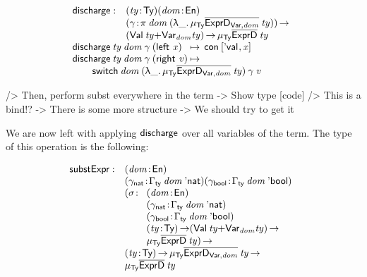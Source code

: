 \[\stk{
\begin{array}{@{}ll}
\discharge : & \PITEL{\V{ty}}{\Ty}
               \PITEL{\V{dom}}{\EnumU} \\
             & \PI{\V{\gamma}}{\spi{\V{dom}}{(\LAM{\_} \IMu{\Ty}{\toIDesc{\HExprVarD{\V{dom}}}}{\V{ty}})}} \\
             & (\SUM{\Val{\V{ty}}}{\Var{\V{dom}}{\V{ty}}}) \To
               \IMu{\Ty}{\toIDesc{\HExprD}}{\V{ty}} 
\end{array} \\
\begin{array}{@{}l@{\:\mapsto\:\:}l}
\discharge\: \V{ty}\: \V{dom}\: \V{\gamma}\: (\SumLeft \V{x})  & \Con{\pair{\Eval{\!}}{\V{x}}{}} \\
\discharge\: \V{ty}\: \V{dom}\: \V{\gamma}\: (\SumRight \V{v}) &
\end{array}\\
\qquad\switch{\V{dom}}{(\LAM{\_}
\IMu{\Ty}{\toIDesc{\HExprVarD{\V{dom}}}}{\V{ty}})}{\V{\gamma}}{\V{v}}
}\]

\begin{wstructure}
            /> Then, perform subst everywhere in the term
                -> Show type [code]
                /> This is a bind!?
                -> There is some more structure 
                    -> We should try to get it
\end{wstructure}

We are now left with applying $\discharge$ over all variables of the
term. The type of this operation is the following:

\newcommand{\substH}{\F{substExpr}}
\newcommand{\domNat}{dom_{\CN{nat}}}
\newcommand{\domBool}{dom_{\CN{bool}}}
\newcommand{\gammaNat}{\V{\ensuremath{\gamma_{\CN{nat}}}}}
\newcommand{\gammaBool}{\V{\ensuremath{\gamma_{\CN{bool}}}}}
\newcommand{\GammaSpi}[2]{\F{\ensuremath{\Gamma_{\CN{ty}}}}\: #1\: #2}

\[
\begin{array}{@{}ll}
\substH  : & \PITEL{\V{dom}}{\EnumU} \\
           & \PITEL{\V{\gammaNat}}{\GammaSpi{\V{dom}}{\Enat}} 
             \PITEL{\V{\gammaBool}}{\GammaSpi{\V{dom}}{\Ebool}} \\
           & \begin{array}{@{}ll}
             \PI{\V{\sigma}}{& \PITEL{\V{dom}}{\EnumU} \\
                             & \PITEL{\V{\gammaNat}}
                                     {\GammaSpi{\V{dom}}{\Enat}} \\
                             & \PITEL{\V{\gammaBool}}
                                     {\GammaSpi{\V{dom}}{\Ebool}} \\
                             & \PI{\V{ty}}{\Ty} (\SUM{\Val{\V{ty}}}{\Var{\V{dom}}{\V{ty}}}) \To \\
                             & \IMu{\Ty}{\toIDesc{\HExprD}}{\V{ty}}}
             \end{array}\\
          & \PI{\V{ty}}{\Ty}
            \IMu{\Ty}{\toIDesc{\HExprVarD{\V{dom}}}}{\V{ty}} \To \\
          & \IMu{\Ty}{\toIDesc{\HExprD}}{\V{ty}}
\end{array}
\]

